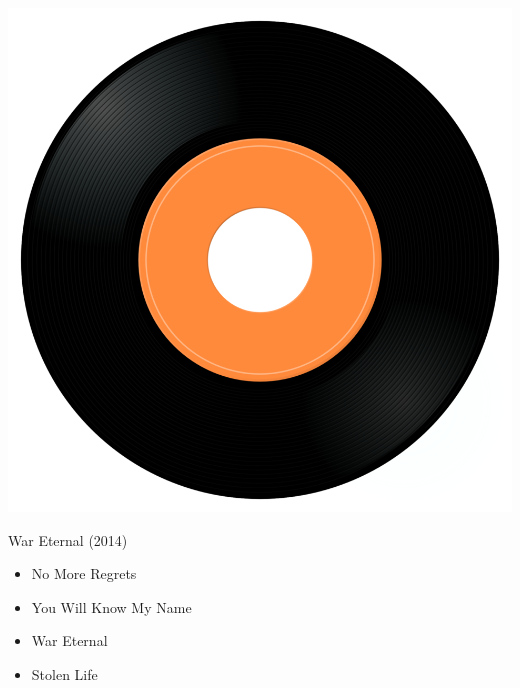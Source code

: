 \begin{minipage}[t]{0.25\textwidth}\vspace{0pt}
\captionsetup{type=figure}
\includegraphics[width=\textwidth]{Images/cover.png}
\caption*{War Eternal (2014)}
\end{minipage}
\begin{minipage}[t]{0.25\textwidth}\vspace{0pt}
\begin{itemize}[nosep,leftmargin=1em,labelwidth=*,align=left]
	\setlength{\itemsep}{0pt}
	\item No More Regrets
	\item You Will Know My Name
	\item War Eternal
	\item Stolen Life
\end{itemize}
\end{minipage}

